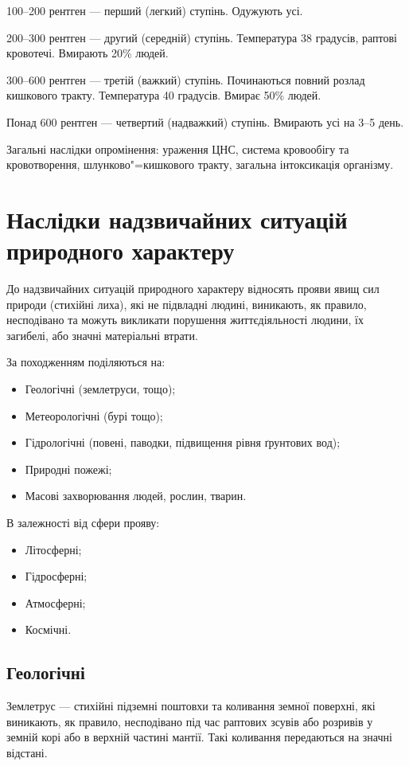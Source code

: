 \documentclass[a4paper,10pt,notitlepage,pdftex,headsepline]{scrartcl}
\begin{document}
  100--200 рентген --- перший (легкий) ступінь. Одужують усі.

  200--300 рентген --- другий (середній) ступінь. Температура 38 градусів,
  раптові кровотечі. Вмирають 20\% людей.

  300--600 рентген --- третій (важкий) ступінь. Починаються повний розлад
  кишкового тракту. Температура 40 градусів. Вмирає 50\% людей.

  Понад 600 рентген --- четвертий (надважкий) ступінь. Вмирають усі на 3--5
  день.

  Загальні наслідки опромінення: ураження ЦНС, система кровообігу та
  кровотворення, шлунково"=кишкового тракту, загальна інтоксикація організму.
\section{Наслідки надзвичайних ситуацій природного характеру}
  До надзвичайних ситуацій природного характеру відносять прояви явищ сил
  природи (стихійні лиха), які не підвладні людині, виникають, як правило,
  несподівано та можуть викликати порушення життєдіяльності людини, їх
  загибелі, або значні матеріальні втрати.

  За походженням поділяються на:
  \begin{itemize}
    \item Геологічні (землетруси, тощо);
    \item Метеорологічні (бурі тощо);
    \item Гідрологічні (повені, паводки, підвищення рівня ґрунтових вод);
    \item Природні пожежі;
    \item Масові захворювання людей, рослин, тварин.
  \end{itemize}

  В залежності від сфери прояву:
  \begin{itemize}
    \item Літосферні;
    \item Гідросферні;
    \item Атмосферні;
    \item Космічні.
  \end{itemize}

  \subsection{Геологічні}
    Землетрус --- стихійні підземні поштовхи та коливання земної поверхні,
    які виникають, як правило, несподівано під час раптових зсувів або
    розривів у земній корі або в верхній частині мантії.
    Такі коливання передаються на значні відстані.
\end{document}
